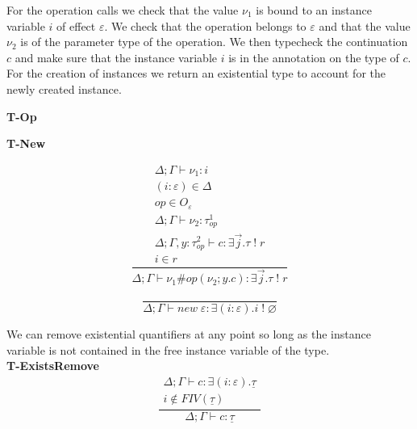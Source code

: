 \documentclass[12pt]{article}
\newcommand\eff[0]{\varepsilon}
\newcommand\Op[0]{O}
\newcommand\op[0]{op}
\newcommand\pty[1]{\ty^1_{#1}}
\newcommand\rty[1]{\ty^2_{#1}}
\newcommand\ty[0]{\tau}
\newcommand\cty[0]{\underline{\ty}}
\newcommand\aty[2]{#1 \; ! \; #2}
\newcommand\texists[3]{\exists(#1:#2) . #3}
\newcommand\texistss[2]{\exists \overrightarrow{#1} . #2}
\newcommand\val[0]{\nu}
\newcommand\comp[0]{c}
\newcommand\copi[5]{#1 \# #2(#3 ; #4 . #5)}
\newcommand\cnew[1]{\textit{new} \; #1}
\begin{document}
For the operation calls we check that the value $\val_1$ is bound to an instance variable $i$ of effect $\eff$.
We check that the operation belongs to $\eff$ and that the value $\val_2$ is of the parameter type of the operation.
We then typecheck the continuation $c$ and make sure that the instance variable $i$ is in the annotation on the type of $c$. \\
For the creation of instances we return an existential type to account for the newly created instance. \\
\begin{minipage}{0.5\textwidth}
\textbf{T-Op}
\end{minipage}
\begin{minipage}{0.5\textwidth}
\textbf{T-New}
\end{minipage}
\begin{minipage}{0.5\textwidth}
\[\frac{
	\begin{array}{l}
	\Delta;\Gamma \vdash \val_1 : i \\
	(i:\eff)\in\Delta \\
	\op \in \Op_\eff\\
	\Delta;\Gamma \vdash \val_2 : \pty{\op} \\
	\Delta;\Gamma , y : \rty{\op} \vdash \comp : \texistss{j}{\aty{\ty}{r}} \\
	i \in r
	\end{array}
}{
	\Delta;\Gamma \vdash \copi{\val_1}{\op}{\val_2}{y}{\comp} : \texistss{j}{\aty{\ty}{r}}
}\]
\vspace{10pt}
\end{minipage}
\begin{minipage}{0.5\textwidth}
\[\frac{
}{
	\Delta;\Gamma \vdash \cnew{\eff} : \texists{i}{\eff}{\aty{i}{\varnothing}}
}\]
\vspace{10pt}
\end{minipage}
\newpage
We can remove existential quantifiers at any point so long as the instance variable is not contained in the free instance variable of the type. \\
\textbf{T-ExistsRemove}
\[\frac{
	\begin{array}{l}
	\Delta;\Gamma \vdash c : \texists{i}{\eff}{\cty} \\
	i \notin FIV(\cty)
	\end{array}
}{
	\Delta;\Gamma \vdash c : \cty
}\]
\end{document}
